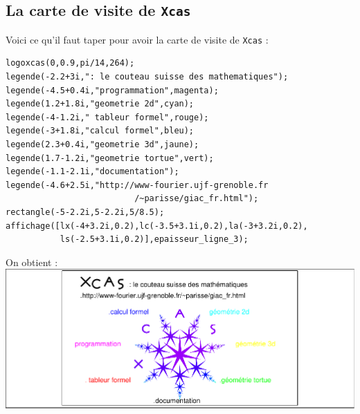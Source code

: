 \documentclass[a4paper,11pt]{book}
\begin{document}
\subsection{La carte de visite de {\tt Xcas}}
Voici ce qu'il faut taper pour avoir la carte de visite de {\tt Xcas} :
\begin{verbatim}
logoxcas(0,0.9,pi/14,264);
legende(-2.2+3i,": le couteau suisse des mathematiques");
legende(-4.5+0.4i,"programmation",magenta);
legende(1.2+1.8i,"geometrie 2d",cyan);
legende(-4-1.2i," tableur formel",rouge);
legende(-3+1.8i,"calcul formel",bleu);
legende(2.3+0.4i,"geometrie 3d",jaune);
legende(1.7-1.2i,"geometrie tortue",vert);
legende(-1.1-2.1i,"documentation");
legende(-4.6+2.5i,"http://www-fourier.ujf-grenoble.fr
                          /~parisse/giac_fr.html");
rectangle(-5-2.2i,5-2.2i,5/8.5);
affichage([lx(-4+3.2i,0.2),lc(-3.5+3.1i,0.2),la(-3+3.2i,0.2),
           ls(-2.5+3.1i,0.2)],epaisseur_ligne_3);
\end{verbatim}
On obtient :\\
\includegraphics[width=\textwidth]{cartexcas}
\end{document}
